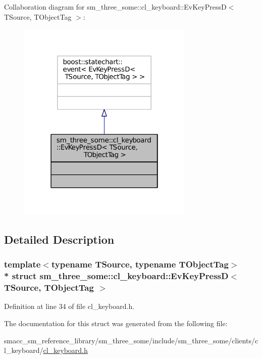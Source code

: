 Collaboration diagram for sm\+\_\+three\+\_\+some\+:\+:cl\+\_\+keyboard\+:\+:Ev\+Key\+PressD$<$ T\+Source, T\+Object\+Tag $>$\+:
\nopagebreak
\begin{figure}[H]
\begin{center}
\leavevmode
\includegraphics[width=238pt]{structsm__three__some_1_1cl__keyboard_1_1EvKeyPressD__coll__graph}
\end{center}
\end{figure}


\subsection{Detailed Description}
\subsubsection*{template$<$typename T\+Source, typename T\+Object\+Tag$>$\\*
struct sm\+\_\+three\+\_\+some\+::cl\+\_\+keyboard\+::\+Ev\+Key\+Press\+D$<$ T\+Source, T\+Object\+Tag $>$}



Definition at line 34 of file cl\+\_\+keyboard.\+h.



The documentation for this struct was generated from the following file\+:\begin{DoxyCompactItemize}
\item 
smacc\+\_\+sm\+\_\+reference\+\_\+library/sm\+\_\+three\+\_\+some/include/sm\+\_\+three\+\_\+some/clients/cl\+\_\+keyboard/\hyperlink{cl__keyboard_8h}{cl\+\_\+keyboard.\+h}\end{DoxyCompactItemize}

